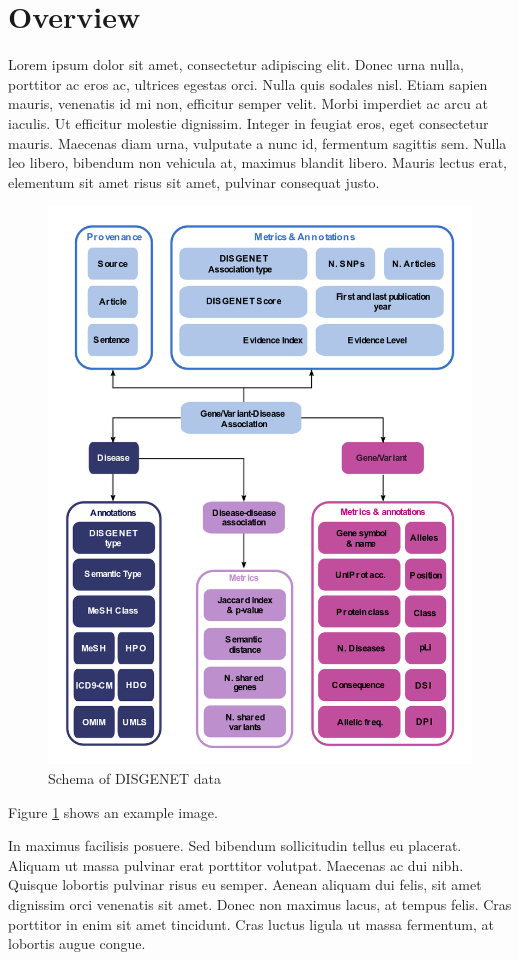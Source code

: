 \section{ Overview }


Lorem ipsum dolor sit amet, consectetur adipiscing elit. Donec urna nulla, porttitor ac eros ac, ultrices egestas orci. 
Nulla quis sodales nisl. Etiam sapien mauris, venenatis id mi non, efficitur semper velit. Morbi imperdiet ac arcu at iaculis. 
Ut efficitur molestie dignissim. Integer in feugiat eros, eget consectetur mauris. Maecenas diam urna, vulputate a nunc id, fermentum sagittis sem. 
Nulla leo libero, bibendum non vehicula at, maximus blandit libero. Mauris lectus erat, elementum sit amet risus sit amet, pulvinar consequat justo. 

\begin{figure}[H]
    \includegraphics[width=\linewidth,scale=0.5]{images/disgenet-data-schema.png}
    \caption{Schema of DISGENET data}
    \label{fig-disgenet-schema}
\end{figure}

Figure \ref{fig-disgenet-schema} shows an example image.

In maximus facilisis posuere. Sed bibendum sollicitudin tellus eu placerat. 
Aliquam ut massa pulvinar erat porttitor volutpat. Maecenas ac dui nibh. Quisque lobortis pulvinar risus eu semper. 
Aenean aliquam dui felis, sit amet dignissim orci venenatis sit amet. 
Donec non maximus lacus, at tempus felis. Cras porttitor in enim sit amet tincidunt. 
Cras luctus ligula ut massa fermentum, at lobortis augue congue. 

\pagebreak